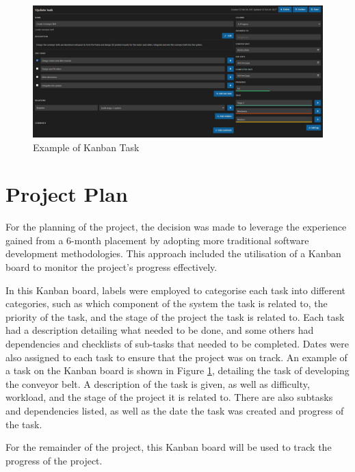 \begin{figure}[t]
  \begin{minipage}[t]{\textwidth}
    \centering
    \includegraphics[width=\textwidth, height=\textheight, keepaspectratio]{imgs/appendix/taskexample.jpg}
    \caption{Example of Kanban Task}
    \label{fig:kantask}
  \end{minipage}
  \hfill 
\end{figure}

\section{Project Plan}
\label{sec:projectplan}
For the planning of the project, the decision was made to leverage the experience gained from a 6-month placement by adopting more traditional software development methodologies.
This approach included the utilisation of a Kanban board to monitor the project's progress effectively.

In this Kanban board, labels were employed to categorise each task into different categories, such as
which component of the system the task is related to, the priority of the task, and the stage of the project the task is related to.
Each task had a description detailing what needed to be done, and some others had dependencies and checklists of sub-tasks that needed to be completed.
Dates were also assigned to each task to ensure that the project was on track. An example of a task on the Kanban board is shown in Figure \ref*{fig:kantask},
detailing the task of developing the conveyor belt. A description of the task is given, as well as difficulty, workload, and the stage of the project it is related to.
There are also subtasks and dependencies listed, as well as the date the task was created and progress of the task.

For the remainder of the project, this Kanban board will be used to track the progress of the project. 

